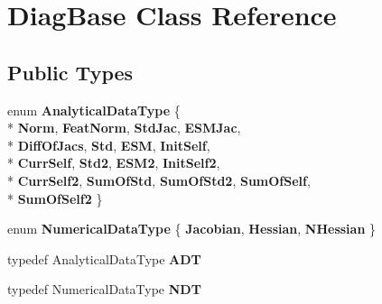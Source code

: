 \hypertarget{classDiagBase}{\section{Diag\-Base Class Reference}
\label{classDiagBase}
}
\subsection*{Public Types}
\begin{DoxyCompactItemize}
\item 
enum {\bfseries Analytical\-Data\-Type} \{ \\*
{\bfseries Norm}, 
{\bfseries Feat\-Norm}, 
{\bfseries Std\-Jac}, 
{\bfseries E\-S\-M\-Jac}, 
\\*
{\bfseries Diff\-Of\-Jacs}, 
{\bfseries Std}, 
{\bfseries E\-S\-M}, 
{\bfseries Init\-Self}, 
\\*
{\bfseries Curr\-Self}, 
{\bfseries Std2}, 
{\bfseries E\-S\-M2}, 
{\bfseries Init\-Self2}, 
\\*
{\bfseries Curr\-Self2}, 
{\bfseries Sum\-Of\-Std}, 
{\bfseries Sum\-Of\-Std2}, 
{\bfseries Sum\-Of\-Self}, 
\\*
{\bfseries Sum\-Of\-Self2}
 \}
\item 
enum {\bfseries Numerical\-Data\-Type} \{ {\bfseries Jacobian}, 
{\bfseries Hessian}, 
{\bfseries N\-Hessian}
 \}
\item 
\hypertarget{classDiagBase_a426a116745989c7137fb512fa7d584f2}{typedef Analytical\-Data\-Type {\bfseries A\-D\-T}}\label{classDiagBase_a426a116745989c7137fb512fa7d584f2}

\item 
\hypertarget{classDiagBase_a5ec839186aabccb0f15827bfa3b5642e}{typedef Numerical\-Data\-Type {\bfseries N\-D\-T}}\label{classDiagBase_a5ec839186aabccb0f15827bfa3b5642e}

\end{DoxyCompactItemize}
